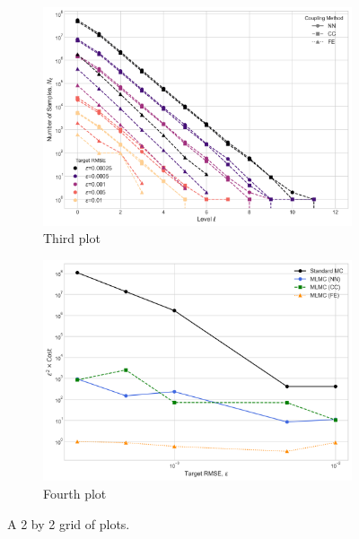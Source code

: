 \begin{figure}[htbp]
    \begin{subfigure}{0.45\textwidth}
        \centering
        \includegraphics[width=\linewidth]{graphics/she_energy_nums.png}
        \caption{Third plot}
        \label{fig:plot3}
    \end{subfigure}
    \hfill
    \begin{subfigure}{0.45\textwidth}
        \centering
        \includegraphics[width=\linewidth]{graphics/she_costs.png}
        \caption{Fourth plot}
        \label{fig:plot4}
    \end{subfigure}

    \caption{A 2 by 2 grid of plots.}
    \label{fig:2by2plots}
\end{figure}
